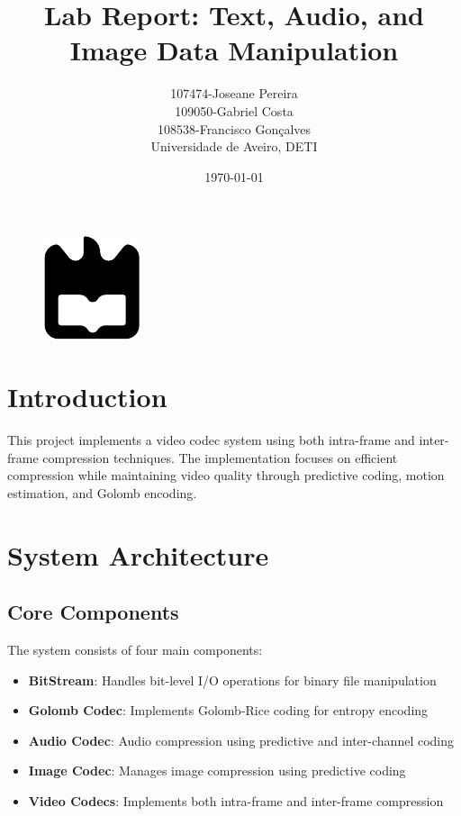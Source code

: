 \documentclass[a4paper,14pt]{article}
\title{Lab Report: Text, Audio, and Image Data Manipulation}
\author{107474-Joseane Pereira \\
109050-Gabriel Costa \\
108538-Francisco Gonçalves \\
Universidade de Aveiro, DETI}
\date{\today}
\begin{document}
\begin{figure}
    \centering
    \includegraphics[width=0.3\linewidth]{ua.pdf}
    \label{fig:enter-label}
\end{figure}
\maketitle
\newpage
\tableofcontents
\newpage

\section{Introduction}
This project implements a video codec system using both intra-frame and inter-frame compression techniques. The implementation focuses on efficient compression while maintaining video quality through predictive coding, motion estimation, and Golomb encoding.

\section{System Architecture}

\subsection{Core Components}
The system consists of four main components:
\begin{itemize}
    \item \textbf{BitStream}: Handles bit-level I/O operations for binary file manipulation
    \item \textbf{Golomb Codec}: Implements Golomb-Rice coding for entropy encoding
    \item \textbf{Audio Codec}: Audio compression using predictive and inter-channel coding
    \item \textbf{Image Codec}: Manages image compression using predictive coding
    \item \textbf{Video Codecs}: Implements both intra-frame and inter-frame compression
\end{itemize}
\end{document}
